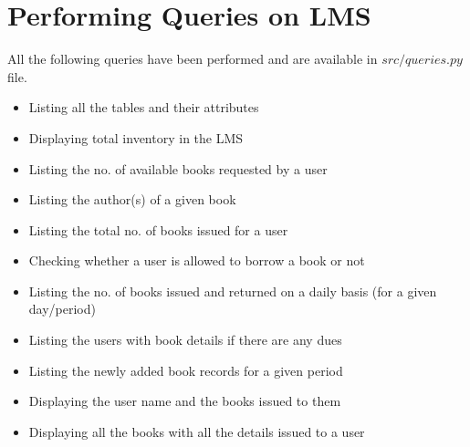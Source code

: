 \documentclass{article}
\begin{document}
\section{Performing Queries on LMS}
All the following queries have been performed and are available in $\textit{src/queries.py}$ file.
\begin{itemize}
    \item Listing all the tables and their attributes
    \item Displaying total inventory in the LMS
    \item Listing the no. of available books requested by a user
    \item Listing the author(s) of a given book
    \item Listing the total no. of books issued for a user
    \item Checking whether a user is allowed to borrow a book or not
    \item Listing the no. of books issued and returned on a daily basis (for a given day/period)
    \item Listing the users with book details if there are any dues
    \item Listing the newly added book records for a given period
    \item Displaying the user name and the books issued to them
    \item Displaying all the books with all the details issued to a user
\end{itemize}
\end{document}
